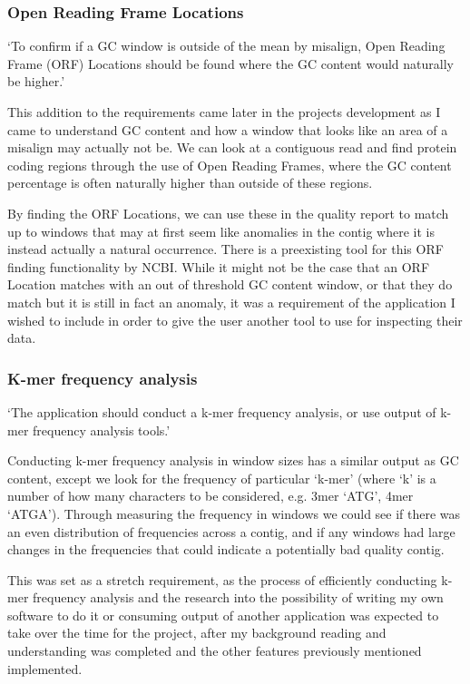 \subsubsection{Open Reading Frame Locations}
`To confirm if a GC window is outside of the mean by misalign, Open Reading Frame (ORF) Locations should be found where the GC content would naturally be higher.'

This addition to the requirements came later in the projects development as I came to understand GC content and how a window that looks like an area of a misalign may actually not be. We can look at a contiguous read and find protein coding regions through the use of Open Reading Frames\cite{orfdefinition}, where the GC content percentage is often naturally higher than outside of these regions.

By finding the ORF Locations, we can use these in the quality report to match up to windows that may at first seem like anomalies in the contig where it is instead actually a natural occurrence. There is a preexisting tool for this ORF finding functionality by NCBI\cite{orffinder}. While it might not be the case that an ORF Location matches with an out of threshold GC content window, or that they do match but it is still in fact an anomaly, it was a requirement of the application I wished to include in order to give the user another tool to use for inspecting their data.

\subsubsection{K-mer frequency analysis}
`The application should conduct a k-mer frequency analysis, or use output of k-mer frequency analysis tools.'

Conducting k-mer frequency analysis in window sizes has a similar output as GC content, except we look for the frequency of particular `k-mer' (where `k' is a number of how many characters to be considered, e.g. 3mer `ATG', 4mer `ATGA'). Through measuring the frequency in windows we could see if there was an even distribution of frequencies across a contig, and if any windows had large changes in the frequencies that could indicate a potentially bad quality contig.

This was set as a stretch requirement, as the process of efficiently conducting k-mer frequency analysis and the research into the possibility of writing my own software to do it or consuming output of another application was expected to take over the time for the project, after my background reading and understanding was completed and the other features previously mentioned implemented.

